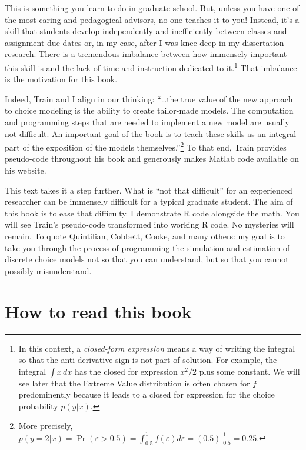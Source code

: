\documentclass[
  letterpaper,
  DIV=11,
  numbers=noendperiod]{scrreprt}
\begin{document}
This is something you learn to do in graduate school. But, unless you
have one of the most caring and pedagogical advisors, no one teaches it
to you! Instead, it's a skill that students develop independently and
inefficiently between classes and assignment due dates or, in my case,
after I was knee-deep in my dissertation research. There is a tremendous
imbalance between how immensely important this skill is and the lack of
time and instruction dedicated to it.\footnote{In this context, a
  \emph{closed-form expression} means a way of writing the integral so
  that the anti-derivative sign is not part of solution. For example,
  the integral \(\int x \, dx\) has the closed for expression \(x^2/2\)
  plus some constant. We will see later that the Extreme Value
  distribution is often chosen for \(f\) predominently because it leads
  to a closed for expression for the choice probability \(p(y|x)\).}
That imbalance is the motivation for this book.

Indeed, Train and I align in our thinking: ``\ldots the true value of
the new approach to choice modeling is the ability to create tailor-made
models. The computation and programming steps that are needed to
implement a new model are usually not difficult. An important goal of
the book is to teach these skills as an integral part of the exposition
of the models themselves.''\footnote{More precisely,
  \(p(y=2|x) = \Pr(\varepsilon > 0.5) = \int_{0.5}^1 f(\varepsilon) d\varepsilon = (0.5)\vert_{0.5}^1 = 0.25\).}
To that end, Train provides pseudo-code throughout his book and
generously makes Matlab code available on his website.

This text takes it a step further. What is ``not that difficult'' for an
experienced researcher can be immensely difficult for a typical graduate
student. The aim of this book is to ease that difficulty. I demonstrate
R code alongside the math. You will see Train's pseudo-code transformed
into working R code. No mysteries will remain. To quote Quintilian,
Cobbett, Cooke, and many others: my goal is to take you through the
process of programming the simulation and estimation of discrete choice
models not so that you can understand, but so that you cannot possibly
misunderstand.

\section*{How to read this book}\label{how-to-read-this-book}
\end{document}
